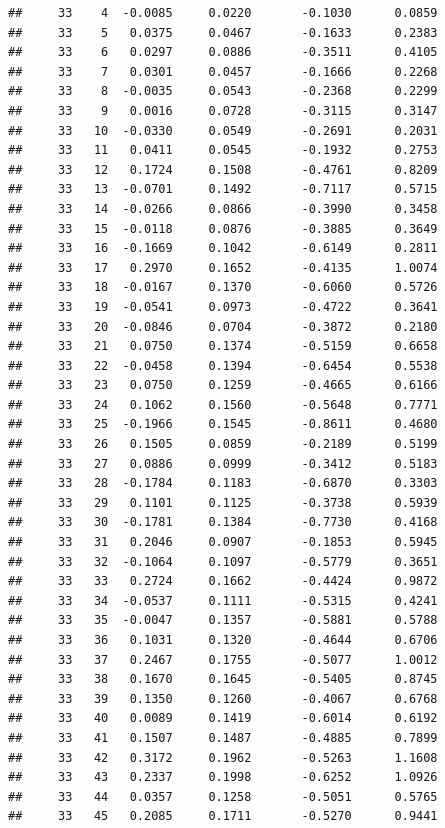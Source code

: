 \documentclass[
]{article}
\begin{document}
\begin{verbatim}
##     33    4  -0.0085     0.0220       -0.1030      0.0859 
##     33    5   0.0375     0.0467       -0.1633      0.2383 
##     33    6   0.0297     0.0886       -0.3511      0.4105 
##     33    7   0.0301     0.0457       -0.1666      0.2268 
##     33    8  -0.0035     0.0543       -0.2368      0.2299 
##     33    9   0.0016     0.0728       -0.3115      0.3147 
##     33   10  -0.0330     0.0549       -0.2691      0.2031 
##     33   11   0.0411     0.0545       -0.1932      0.2753 
##     33   12   0.1724     0.1508       -0.4761      0.8209 
##     33   13  -0.0701     0.1492       -0.7117      0.5715 
##     33   14  -0.0266     0.0866       -0.3990      0.3458 
##     33   15  -0.0118     0.0876       -0.3885      0.3649 
##     33   16  -0.1669     0.1042       -0.6149      0.2811 
##     33   17   0.2970     0.1652       -0.4135      1.0074 
##     33   18  -0.0167     0.1370       -0.6060      0.5726 
##     33   19  -0.0541     0.0973       -0.4722      0.3641 
##     33   20  -0.0846     0.0704       -0.3872      0.2180 
##     33   21   0.0750     0.1374       -0.5159      0.6658 
##     33   22  -0.0458     0.1394       -0.6454      0.5538 
##     33   23   0.0750     0.1259       -0.4665      0.6166 
##     33   24   0.1062     0.1560       -0.5648      0.7771 
##     33   25  -0.1966     0.1545       -0.8611      0.4680 
##     33   26   0.1505     0.0859       -0.2189      0.5199 
##     33   27   0.0886     0.0999       -0.3412      0.5183 
##     33   28  -0.1784     0.1183       -0.6870      0.3303 
##     33   29   0.1101     0.1125       -0.3738      0.5939 
##     33   30  -0.1781     0.1384       -0.7730      0.4168 
##     33   31   0.2046     0.0907       -0.1853      0.5945 
##     33   32  -0.1064     0.1097       -0.5779      0.3651 
##     33   33   0.2724     0.1662       -0.4424      0.9872 
##     33   34  -0.0537     0.1111       -0.5315      0.4241 
##     33   35  -0.0047     0.1357       -0.5881      0.5788 
##     33   36   0.1031     0.1320       -0.4644      0.6706 
##     33   37   0.2467     0.1755       -0.5077      1.0012 
##     33   38   0.1670     0.1645       -0.5405      0.8745 
##     33   39   0.1350     0.1260       -0.4067      0.6768 
##     33   40   0.0089     0.1419       -0.6014      0.6192 
##     33   41   0.1507     0.1487       -0.4885      0.7899 
##     33   42   0.3172     0.1962       -0.5263      1.1608 
##     33   43   0.2337     0.1998       -0.6252      1.0926 
##     33   44   0.0357     0.1258       -0.5051      0.5765 
##     33   45   0.2085     0.1711       -0.5270      0.9441 

\end{verbatim}
\end{document}
